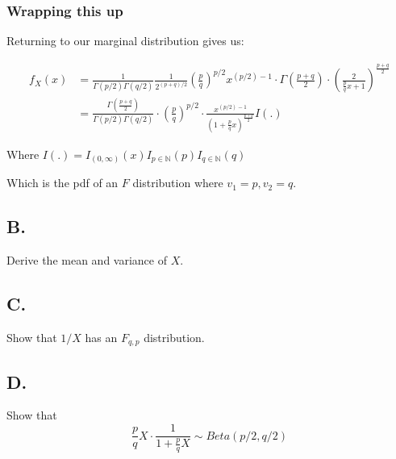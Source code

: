 \pagebreak
\subsubsection*{Wrapping this up}

Returning to our marginal distribution gives us:

\begin{align*}
	f_X(x) &= \frac{1}{\Gamma(p/2)\Gamma(q/2)} 
	\frac{1}{2^{(p+q)/2}} 
	\left( \frac{p}{q} \right)^{p/2} 
	x^{(p/2)-1} \cdot \Gamma\left( \frac{p+q}{2} \right) \cdot \left( \frac{2}{\frac{p}{q}x + 1} \right)^{\frac{p+q}{2}} \\
	&= \frac{\Gamma\left( \frac{p+q}{2} \right)}{\Gamma(p/2)\Gamma(q/2)} \cdot \left( \frac{p}{q} \right)^{p/2} \cdot 
	\frac{x^{(p/2)-1}}{\left(1+ \frac{p}{q}x\right)^{\frac{p+q}{2}}} I(.)
\end{align*}

Where $I(.) = I_{(0,\infty)}(x)I_{p \in \mathbb{N}}(p)I_{q \in \mathbb{N}}(q)$

Which is the pdf of an $F$ distribution where $v_1=p, v_2=q$. 

\subsection*{B.}

Derive the mean and variance of $X$.

\subsection*{C.}

Show that $1/X$ has an $F_{q,p}$ distribution.

\subsection*{D.}

Show that 
\[\frac{p}{q}X \cdot \frac{1}{1+\frac{p}{q}X} \sim Beta(p/2, q/2)\]
